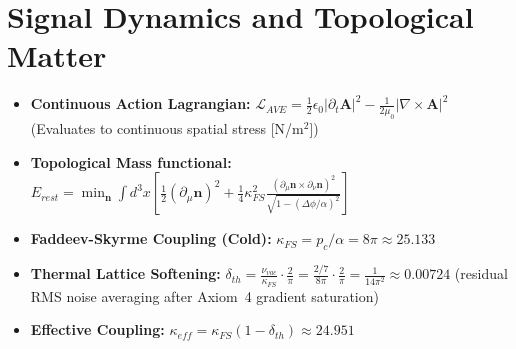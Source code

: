 \section{Signal Dynamics and Topological Matter}
\begin{itemize}
    \item \textbf{Continuous Action Lagrangian:} $\mathcal{L}_{AVE} = \frac{1}{2}\epsilon_0 |\partial_t \mathbf{A}|^2 - \frac{1}{2\mu_0} |\nabla \times \mathbf{A}|^2$ (Evaluates to continuous spatial stress [N/m$^2$])
    \item \textbf{Topological Mass functional:} $E_{rest} = \min_{\mathbf{n}} \int d^3x \left[ \frac{1}{2} (\partial_\mu \mathbf{n})^2 + \frac{1}{4} \kappa_{FS}^2 \frac{(\partial_\mu \mathbf{n} \times \partial_\nu \mathbf{n})^2}{\sqrt{1 - (\Delta\phi / \alpha)^2}} \right]$
    \item \textbf{Faddeev-Skyrme Coupling (Cold):} $\kappa_{FS} = p_c / \alpha = 8\pi \approx 25.133$
    \item \textbf{Thermal Lattice Softening:} $\delta_{th} = \frac{\nu_{vac}}{\kappa_{FS}} \cdot \frac{2}{\pi} = \frac{2/7}{8\pi} \cdot \frac{2}{\pi} = \frac{1}{14\pi^2} \approx 0.00724$ (residual RMS noise averaging after Axiom~4 gradient saturation)
    \item \textbf{Effective Coupling:} $\kappa_{eff} = \kappa_{FS}(1-\delta_{th}) \approx 24.951$

\end{itemize}
